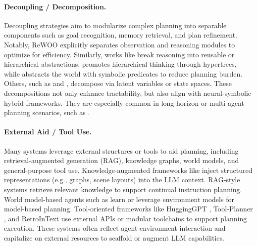 \paragraph{Decoupling / Decomposition.} Decoupling strategies aim to modularize complex planning into separable components such as goal recognition, memory retrieval, and plan refinement. Notably, ReWOO \cite{xu2023rewoo} explicitly separates observation and reasoning modules to optimize for efficiency. Similarly, works like \cite{zhang2025atomic, dong2024diffuserlite,lo2024goal,li2024agent,wang2023goplan,vyas2024llm,kang2025retrointext} break reasoning into reusable or hierarchical abstractions. \cite{gui2025hypertree} promotes hierarchical thinking through hypertrees, while \cite{liang2024visualpredicator} abstracts the world with symbolic predicates to reduce planning burden. Others, such as \cite{ye2024beyond} and \cite{kong2024latent}, decompose via latent variables or state spaces. These decompositions not only enhance tractability, but also align with neural-symbolic hybrid frameworks. They are especially common in long-horizon or multi-agent planning scenarios, such as \cite{zheng2024planagent,nayak2024long}.\nocite{wei2024robust,bao2025latte,chen2024wapiti,liu2025breaking,liu2024logic,liu2024class,liu2024aim,liu2023topological,zeng2025pave,zeng2024graph,lin2025moralise,lin2024backtime,qiu2025saffron,qiu2025ask,qiu2025efficient,qiu2024tucket,qiu2023reconstructing,qiu2022dimes,xu2024discrete,li2025model,zou2025transformer,qiu2024gradient,yoo2025embracing,yoo2025generalizable,yoo2024ensuring,chan2024group,wu2024fair,he2024sensitivity,wang2023networked}

\paragraph{External Aid / Tool Use.} Many systems leverage external structures or tools to aid planning, including retrieval-augmented generation (RAG), knowledge graphs, world models, and general-purpose tool use. Knowledge-augmented frameworks like \cite{chen2024plan,cornelio2025hierarchical,meng2025telograf,zhong2024flexplanner, zhang2025atomic} inject structured representations (e.g., graphs, scene layouts) into the LLM context. RAG-style systems \cite{yoo2024exploratory,li2024benchmarking, zou2025gtr} retrieve relevant knowledge to support continual instruction planning. World model-based agents such as \cite{hao2023reasoning,guan2023leveraging,qiao2024agent,zhou2024behaviorgpt,zhou2024dino,gao2024flip,liu2025continual,wang2025adawm} learn or leverage environment models for model-based planning. Tool-oriented frameworks like HuggingGPT \cite{shen2023hugginggpt}, Tool-Planner \cite{liu2025toolplanner}, and RetroInText \cite{kang2025retrointext} use external APIs or modular toolchains to support planning execution. These systems often reflect agent-environment interaction and capitalize on external resources to scaffold or augment LLM capabilities.

